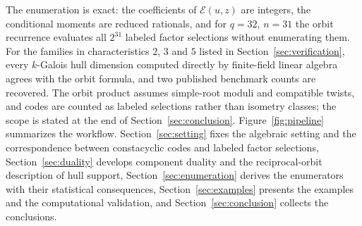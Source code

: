 \documentclass[10pt,a4paper]{article}
\newcommand{\Epoly}{\mathscr E}
\numberwithin{equation}{section}
\theoremstyle{plain}
\theoremstyle{definition}
\theoremstyle{remark}
\begin{document}
The enumeration is exact: the coefficients of $\Epoly(u,z)$ are integers, the
conditional moments are reduced rationals, and for $q=32$, $n=31$ the orbit
recurrence evaluates all $2^{31}$ labeled factor selections without enumerating
them. For the families in characteristics $2$, $3$ and $5$ listed in
Section~\ref{sec:verification}, every $k$-Galois hull dimension computed
directly by finite-field linear algebra agrees with the orbit formula, and two
published benchmark counts \cite{sangwisut2015} are recovered. The orbit product
assumes simple-root moduli and compatible twists, and codes are counted as
labeled selections rather than isometry classes; the scope is stated at the end
of Section~\ref{sec:conclusion}. Figure~\ref{fig:pipeline} summarizes the
workflow. Section~\ref{sec:setting} fixes the algebraic setting and the
correspondence between constacyclic codes and labeled factor selections,
Section~\ref{sec:duality} develops component duality and the reciprocal-orbit
description of hull support, Section~\ref{sec:enumeration} derives the
enumerators with their statistical consequences, Section~\ref{sec:examples}
presents the examples and the computational validation, and
Section~\ref{sec:conclusion} collects the conclusions.
\end{document}
